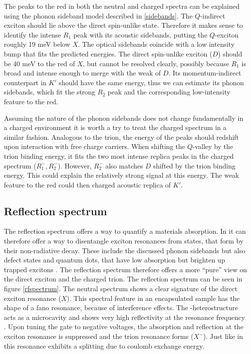 The peaks to the red in both the neutral and charged spectra can be explained using the phonon sideband model described in \ref{sidebands}. The $Q$-indirect exciton should lie above the direct spin-unlike state. Therefore it makes sense to identify the intense $R_1$ peak with its acoustic sidebands, putting the $Q$-exciton roughly 19  meV below $X$. The optical sidebands coincide with a low intensity bump that fits the predicted energies. The direct spin-unlike exciton ($D$) should be 40 meV to the red of $X$, but cannot be resolved clearly, possibly because $R_1$ is broad and intense enough to merge with the weak \pl of $D$. Its momentum-indirect counterpart in $K'$ should have the same energy, thus we can estimate its phonon sidebands, which fit the strong $R_2$ peak and the corresponding low-intensity feature to the red.

Assuming the nature of the phonon sidebands does not change fundamentally in a charged environment it is worth a try to treat the charged spectrum in a similar fashion. Analogous to the trion, the energy of the peaks should redshift upon interaction with free charge carriers. When shifting the $Q$-valley by the trion binding energy, it fits the two most intense replica peaks in the charged spectrum ($R^-_1, R^-_2$). However, $R^-_2$ also matches $D$ shifted by the trion binding energy. This could explain the relatively strong signal at this energy. The weak feature to the red could then charged acoustic replica of $K'$. 

\subsection{Reflection spectrum}

The reflection spectrum offers a way to quantify a materials absorption. In \tmds it can therefore offer a way to disentangle exciton resonances from states, that form by their non-radiative decay. These include the discussed phonon sidebands but also defect states and quantum dots, that have low absorption but brighten up trapped excitons \cite{srivastava_optically_2015}. The reflection spectrum therefore offers a more ``pure'' view on the direct exciton and the charged trion.
The reflection spectrum can be seen in figure \ref{rfspectrum}. The neutral spectrum shows a clear signature of the direct exciton resonance ($X$). This spectral feature in an \hbng encapsulated sample has the shape of a fano resonance, because of interference effects. The \tmd-\hbng heterostructure acts as a microcavity and shows very high reflectivity at the resonance frequency \cite{scuri_large_2018}. Upon tuning the gate to negative voltages, the absorption and reflection at the exciton resonance is suppressed and the trion resonance forms ($X^-$). Just like in \pl this resonance exhibits a splitting due to coulomb exchange energy. 


